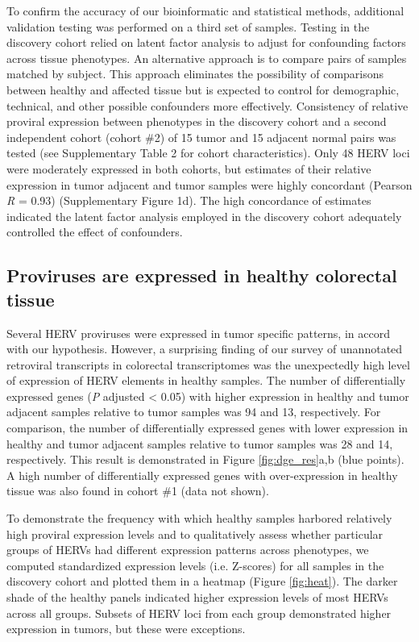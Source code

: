 To confirm the accuracy of our bioinformatic and statistical methods, additional validation testing was performed on a third set of samples.
Testing in the discovery cohort relied on latent factor analysis to adjust for confounding factors across tissue phenotypes.
An alternative approach is to compare pairs of samples matched by subject.
This approach eliminates the possibility of comparisons between healthy and affected tissue but is expected to control for demographic, technical, and other possible confounders more effectively.
Consistency of relative proviral expression between phenotypes in the discovery cohort and a second independent cohort (cohort \#2) of 15 tumor and 15 adjacent normal pairs was tested (see Supplementary Table 2 for cohort characteristics).
Only 48 HERV loci were moderately expressed in both cohorts, but estimates of their relative expression in tumor adjacent and tumor samples were highly concordant (Pearson \emph{R} = 0.93) (Supplementary Figure 1d).
The high concordance of estimates indicated the latent factor analysis employed in the discovery cohort adequately controlled the effect of confounders.

\subsection*{Proviruses are expressed in healthy colorectal tissue}
Several HERV proviruses were expressed in tumor specific patterns, in accord with our hypothesis.
However, a surprising finding of our survey of unannotated retroviral transcripts in colorectal transcriptomes was the unexpectedly high level of expression of HERV elements in healthy samples.
The number of differentially expressed genes (\emph{P} adjusted < 0.05) with higher expression in healthy and tumor adjacent samples relative to tumor samples was 94 and 13, respectively.
For comparison, the number of differentially expressed genes with lower expression in healthy and tumor adjacent samples relative to tumor samples was 28 and 14, respectively.
This result is demonstrated in Figure \ref{fig:dge_res}a,b (blue points).
A high number of differentially expressed genes with over-expression in healthy tissue was also found in cohort \#1 (data not shown).

To demonstrate the frequency with which healthy samples harbored relatively high proviral expression levels and to qualitatively assess whether particular groups of HERVs had different expression patterns across phenotypes, we computed standardized expression levels (i.e. Z-scores) for all samples in the discovery cohort and plotted them in a heatmap (Figure \ref{fig:heat}).
The darker shade of the healthy panels indicated higher expression levels of most HERVs across all groups.
Subsets of HERV loci from each group demonstrated higher expression in tumors, but these were exceptions.

